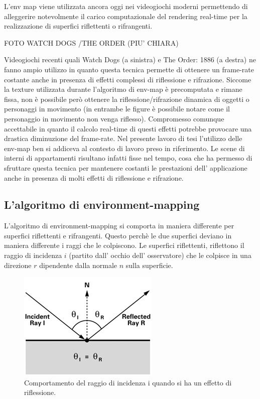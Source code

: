L’env map viene utilizzata ancora oggi nei videogiochi moderni permettendo di alleggerire notevolmente il carico computazionale del rendering real-time per la realizzazione di superfici riflettenti o rifrangenti.

FOTO WATCH DOGS /THE ORDER (PIU' CHIARA)

Videogiochi recenti quali Watch Dogs (a sinistra) e The Order: 1886 (a destra) ne fanno ampio utilizzo in quanto questa tecnica permette di ottenere un frame-rate costante anche in presenza di effetti complessi di riflessione e rifrazione. Siccome la texture utilizzata durante l’algoritmo di env-map è precomputata e rimane fissa, non è possibile però ottenere la riflessione/rifrazione dinamica di oggetti o personaggi in movimento (in entrambe le figure è possibile notare come  il personaggio in movimento non venga riflesso). Compromesso comunque accettabile in quanto il calcolo real-time di questi effetti potrebbe provocare una drastica diminuzione del frame-rate.
Nel presente lavoro di tesi l’utilizzo delle env-map ben si addiceva al contesto di lavoro preso in riferimento. Le scene di interni di appartamenti risultano infatti fisse nel tempo,  cosa che ha permesso di sfruttare questa tecnica per mantenere costanti le prestazioni dell’ applicazione anche in presenza di molti effetti di riflessione e rifrazione.

\subsection{L'algoritmo di environment-mapping}
\label{sec:chapter_stato_arte_algo_envmapping}

L’algoritmo di environment-mapping si comporta in maniera differente per superfici riflettenti e rifrangenti. Questo perchè le due superfici deviano in maniera differente i raggi che le colpiscono.
Le superfici riflettenti, riflettono il raggio di incidenza $i$ (partito dall’ occhio dell’ osservatore) che le colpisce in una direzione $r$ dipendente dalla normale $n$ sulla superficie.
\\
\begin{figure}[htb]
 \centering
 \includegraphics[width=0.5\linewidth]{images/chapter_stato_arte/stato_arte_inc_refl.png}\hfill
 \caption[Env map: riflessione]{Comportamento del raggio di incidenza i quando si ha un effetto di riflessione.}
 \label{fig:stato_arte_inc_refl}
\end{figure}

